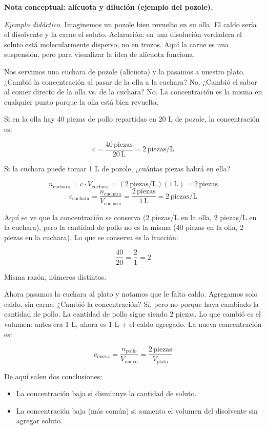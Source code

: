 \begin{notadidactica}
\textbf{Nota conceptual: alícuota y dilución (ejemplo del pozole).}

\textit{Ejemplo didáctico.} Imaginemos un pozole bien revuelto en su olla. 
El caldo sería el disolvente y la carne el soluto. Aclaración: en una disolución 
verdadera el soluto está molecularmente disperso, no en trozos. Aquí la carne 
es una suspensión, pero para visualizar la idea de alícuota funciona.

Nos servimos una cuchara de pozole (alícuota) y la pasamos a nuestro plato. 
¿Cambió la concentración al pasar de la olla a la cuchara? No. ¿Cambió el sabor 
al comer directo de la olla vs. de la cuchara? No. La concentración es la misma 
en cualquier punto porque la olla está bien revuelta.

Si en la olla hay 40 piezas de pollo repartidas en 20 L de pozole, la 
concentración es:

\[
c = \frac{40\,\text{piezas}}{20\,\text{L}} = 2\,\text{piezas/L}
\]

Si la cuchara puede tomar 1 L de pozole, ¿cuántas piezas habrá en ella?

\[
n_{\text{cuchara}} = c \cdot V_{\text{cuchara}} = (2\,\text{piezas/L})(1\,\text{L}) = 2\,\text{piezas}
\]
\[
c_{\text{cuchara}} = \frac{n_{\text{cuchara}}}{V_{\text{cuchara}}} = \frac{2\,\text{piezas}}{1\,\text{L}} = 2\,\text{piezas/L}
\]

Aquí se ve que la concentración se conserva (2 piezas/L en la olla, 2 piezas/L 
en la cuchara), pero la cantidad de pollo no es la misma (40 piezas en la olla, 
2 piezas en la cuchara). Lo que se conserva es la fracción:

\[
\frac{40}{20} = \frac{2}{1} = 2
\]

Misma razón, números distintos.

Ahora pasamos la cuchara al plato y notamos que le falta caldo. Agregamos solo 
caldo, sin carne. ¿Cambió la concentración? Sí, pero no porque haya cambiado 
la cantidad de pollo. La cantidad de pollo sigue siendo 2 piezas. Lo que cambió 
es el volumen: antes era 1 L, ahora es 1 L + el caldo agregado. La nueva 
concentración es:

\[
c_{\text{nueva}} = \frac{n_{\text{pollo}}}{V_{\text{nuevo}}}
= \frac{2\,\text{piezas}}{V_{\text{plato}}}
\]

De aquí salen dos conclusiones:
\begin{itemize}
    \item La concentración baja si disminuye la cantidad de soluto.
    \item La concentración baja (más común) si aumenta el volumen del disolvente 
    sin agregar soluto.
\end{itemize}


\end{notadidactica}
